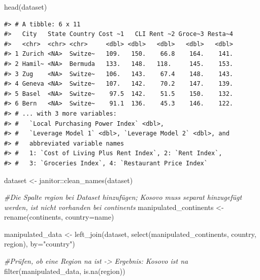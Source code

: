 \documentclass[
  11pt,
  a4paper,
  twoside]{scrbook}
\newenvironment{Shaded}{\begin{snugshade}}{\end{snugshade}}
\newcommand{\AttributeTok}[1]{\textcolor[rgb]{0.77,0.63,0.00}{#1}}
\newcommand{\CommentTok}[1]{\textcolor[rgb]{0.56,0.35,0.01}{\textit{#1}}}
\newcommand{\FunctionTok}[1]{\textcolor[rgb]{0.00,0.00,0.00}{#1}}
\newcommand{\NormalTok}[1]{#1}
\newcommand{\OtherTok}[1]{\textcolor[rgb]{0.56,0.35,0.01}{#1}}
\newcommand{\SpecialCharTok}[1]{\textcolor[rgb]{0.00,0.00,0.00}{#1}}
\newcommand{\StringTok}[1]{\textcolor[rgb]{0.31,0.60,0.02}{#1}}
\begin{document}
\linespread{1}

\begin{Shaded}
\begin{Highlighting}[]

\FunctionTok{head}\NormalTok{(dataset)}
\end{Highlighting}
\end{Shaded}

\linespread{1}

\begin{verbatim}
#> # A tibble: 6 x 11
#>   City   State Country Cost ~1   CLI Rent ~2 Groce~3 Resta~4
#>   <chr>  <chr> <chr>     <dbl> <dbl>   <dbl>   <dbl>   <dbl>
#> 1 Zurich <NA>  Switze~   109.   150.    66.8    164.    141.
#> 2 Hamil~ <NA>  Bermuda   133.   148.   118.     145.    153.
#> 3 Zug    <NA>  Switze~   106.   143.    67.4    148.    143.
#> 4 Geneva <NA>  Switze~   107.   142.    70.2    147.    139.
#> 5 Basel  <NA>  Switze~    97.5  142.    51.5    150.    132.
#> 6 Bern   <NA>  Switze~    91.1  136.    45.3    146.    122.
#> # ... with 3 more variables:
#> #   `Local Purchasing Power Index` <dbl>,
#> #   `Leverage Model 1` <dbl>, `Leverage Model 2` <dbl>, and
#> #   abbreviated variable names
#> #   1: `Cost of Living Plus Rent Index`, 2: `Rent Index`,
#> #   3: `Groceries Index`, 4: `Restaurant Price Index`
\end{verbatim}

\linespread{1}

\begin{Shaded}
\begin{Highlighting}[]

\NormalTok{dataset }\OtherTok{\textless{}{-}}\NormalTok{ janitor}\SpecialCharTok{::}\FunctionTok{clean\_names}\NormalTok{(dataset)}

\CommentTok{\#Die Spalte region bei Dataset hinzufügen; Kosovo muss separat hinzugefügt werden, ist nicht vorhanden bei continents}
\NormalTok{manipulated\_continents }\OtherTok{\textless{}{-}} \FunctionTok{rename}\NormalTok{(continents, }\AttributeTok{country=}\NormalTok{name)}

\NormalTok{manipulated\_data }\OtherTok{\textless{}{-}} \FunctionTok{left\_join}\NormalTok{(dataset, }\FunctionTok{select}\NormalTok{(manipulated\_continents, country, region), }\AttributeTok{by=}\StringTok{"country"}\NormalTok{)}

\CommentTok{\#Prüfen, ob eine Region na ist {-}\textgreater{} Ergebnis: Kosovo ist na}
\FunctionTok{filter}\NormalTok{(manipulated\_data, }\FunctionTok{is.na}\NormalTok{(region))}
\end{Highlighting}
\end{Shaded}
\end{document}
